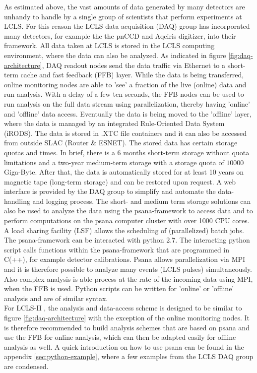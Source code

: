 As estimated above, the vast amounts of data generated by many detectors are unhandy to handle by a single group of scientists that perform experiments at LCLS. For this reason the LCLS data acquisition (DAQ) group has incorporated many detectors, for example the the pnCCD and Aqciris digitizer, into their framework. All data taken at LCLS is stored in the LCLS computing environment, where the data can also be analyzed. As indicated in figure \ref{fig:daq-architecture}, DAQ readout nodes send the data traffic via Ethernet to a short-term cache and fast feedback (FFB) layer. While the data is being transferred, online monitoring nodes are able to 'see' a fraction of the live (online) data and run analysis. With a delay of a few ten seconds, the FFB nodes can be used to run analysis on the full data stream using parallelization, thereby having 'online' and 'offline' data access. Eventually the data is being moved to the 'offline' layer, where the data is managed by an integrated Rule-Oriented Data System (iRODS). The data is stored in .XTC file containers and it can also be accessed from outside SLAC (Router \& ESNET). The stored data has certain storage quotas and times. In brief, there is a 6 months short-term storage without quota limitations and a two-year medium-term storage with a storage quota of $10 000$ Giga-Byte. After that, the data is automatically stored for at least 10 years on magnetic tape (long-term storage) and can be restored upon request. A web interface is provided by the DAQ group to simplify and automate the data-handling and logging process. The short- and medium term storage solutions can also be used to analyze the data using the psana-framework to access data and to perform computations on the psana computer cluster with over 1000 CPU cores. A load sharing facility (LSF) allows the scheduling of (parallelized) batch jobs. The psana-framework can be interacted with python 2.7. The interacting python script calls functions within the psana-framework that are programmed in C(++), for example detector calibrations. Psana allows parallelization via MPI and it is therefore possible to analyze many events (LCLS pulses) simultaneously. Also complex analysis is able process at the rate of the incoming data using MPI, when the FFB is used. Python scripts can be written for 'online' or 'offline' analysis and are of similar syntax.\\
For LCLS-II \citep{Amadeo-2016-SLAC}, the analysis and data-access scheme is designed to be similar to figure \ref{fig:daq-architecture} with the exception of the online monitoring nodes. It is therefore recommended to build analysis schemes that are based on psana and use the FFB for online analysis, which can then be adapted easily for offline analysis as well. A quick introduction on how to use psana can be found in the appendix \ref{sec:python-example}, where a few examples from the LCLS DAQ group are condensed.
%
%
%
